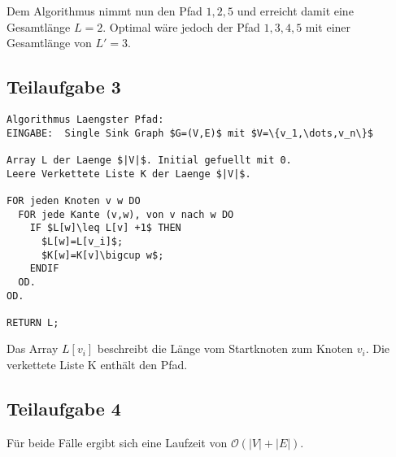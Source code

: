 \documentclass[a4paper, fontsize=10pt]{scrartcl}
\begin{document}
\begin{center}
\end{center}
\bigskip

Dem Algorithmus nimmt nun den Pfad $1,2,5$ und erreicht damit eine Gesamtlänge $L=2$. Optimal wäre jedoch der Pfad $1,3,4,5$ mit einer Gesamtlänge von $L'=3$. \bigskip

\subsection*{Teilaufgabe 3}

\begin{lstlisting}[mathescape]
Algorithmus Laengster Pfad:
EINGABE:  Single Sink Graph $G=(V,E)$ mit $V=\{v_1,\dots,v_n\}$
          
Array L der Laenge $|V|$. Initial gefuellt mit 0.
Leere Verkettete Liste K der Laenge $|V|$.

FOR jeden Knoten v w DO
  FOR jede Kante (v,w), von v nach w DO
    IF $L[w]\leq L[v] +1$ THEN
      $L[w]=L[v_i]$;
      $K[w]=K[v]\bigcup w$;
    ENDIF
  OD.
OD.

RETURN L;

\end{lstlisting}
\bigskip

Das Array $L[v_i]$ beschreibt die Länge vom Startknoten zum Knoten $v_i$. Die verkettete Liste K enthält den Pfad.\bigskip

\subsection*{Teilaufgabe 4}
Für beide Fälle ergibt sich eine Laufzeit von $\mathcal{O}(|V|+|E|)$.
\end{document}

